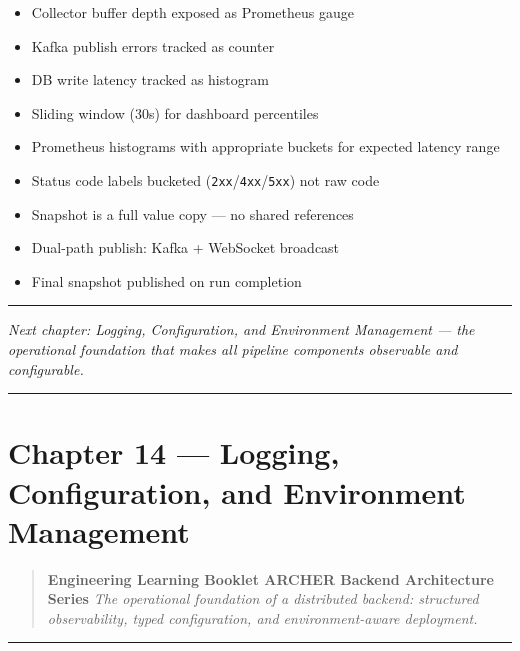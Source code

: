 \documentclass[
]{article}
\providecommand{\tightlist}{%
  \setlength{\itemsep}{0pt}\setlength{\parskip}{0pt}}
\begin{document}
\begin{itemize}
\tightlist
\item[$\square$]
  Collector buffer depth exposed as Prometheus gauge
\item[$\square$]
  Kafka publish errors tracked as counter
\item[$\square$]
  DB write latency tracked as histogram
\item[$\square$]
  Sliding window (30s) for dashboard percentiles
\item[$\square$]
  Prometheus histograms with appropriate buckets for expected latency
  range
\item[$\square$]
  Status code labels bucketed (\texttt{2xx}/\texttt{4xx}/\texttt{5xx})
  not raw code
\item[$\square$]
  Snapshot is a full value copy --- no shared references
\item[$\square$]
  Dual-path publish: Kafka + WebSocket broadcast
\item[$\square$]
  Final snapshot published on run completion
\end{itemize}

\begin{center}\rule{0.5\linewidth}{0.5pt}\end{center}

\emph{Next chapter: Logging, Configuration, and Environment Management
--- the operational foundation that makes all pipeline components
observable and configurable.}

\begin{center}\rule{0.5\linewidth}{0.5pt}\end{center}

\hypertarget{chapter-14-logging-configuration-and-environment-management}{%
\section{Chapter 14 --- Logging, Configuration, and Environment
Management}\label{chapter-14-logging-configuration-and-environment-management}}

\begin{quote}
\textbf{Engineering Learning Booklet \textbar{} ARCHER Backend
Architecture Series} \emph{The operational foundation of a distributed
backend: structured observability, typed configuration, and
environment-aware deployment.}
\end{quote}

\begin{center}\rule{0.5\linewidth}{0.5pt}\end{center}
\end{document}
